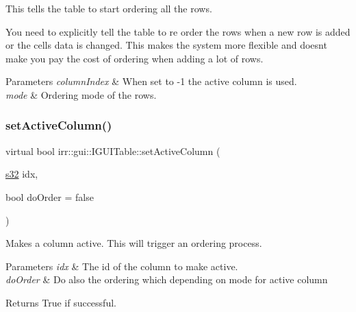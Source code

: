 This tells the table to start ordering all the rows. 

You need to explicitly tell the table to re order the rows when a new row is added or the cells data is changed. This makes the system more flexible and doesn\textquotesingle{}t make you pay the cost of ordering when adding a lot of rows. 
\begin{DoxyParams}{Parameters}
{\em column\+Index} & When set to -\/1 the active column is used. \\
\hline
{\em mode} & Ordering mode of the rows. \\
\hline
\end{DoxyParams}
\mbox{\label{classirr_1_1gui_1_1IGUITable_ae4882275e6695855c0f3ca55e20f554e}} 
\subsubsection{\texorpdfstring{set\+Active\+Column()}{setActiveColumn()}}
{\footnotesize\ttfamily virtual bool irr\+::gui\+::\+I\+G\+U\+I\+Table\+::set\+Active\+Column (\begin{DoxyParamCaption}\item[{\hyperlink{namespaceirr_ac66849b7a6ed16e30ebede579f9b47c6}{s32}}]{idx,  }\item[{bool}]{do\+Order = {\ttfamily false} }\end{DoxyParamCaption})\hspace{0.3cm}{\ttfamily [pure virtual]}}



Makes a column active. This will trigger an ordering process. 


\begin{DoxyParams}{Parameters}
{\em idx} & The id of the column to make active. \\
\hline
{\em do\+Order} & Do also the ordering which depending on mode for active column \\
\hline
\end{DoxyParams}
\begin{DoxyReturn}{Returns}
True if successful. 
\end{DoxyReturn}
\mbox{\label{classirr_1_1gui_1_1IGUITable_a7d0ce2de316fb7f0e6164e8c196a819e}} 
